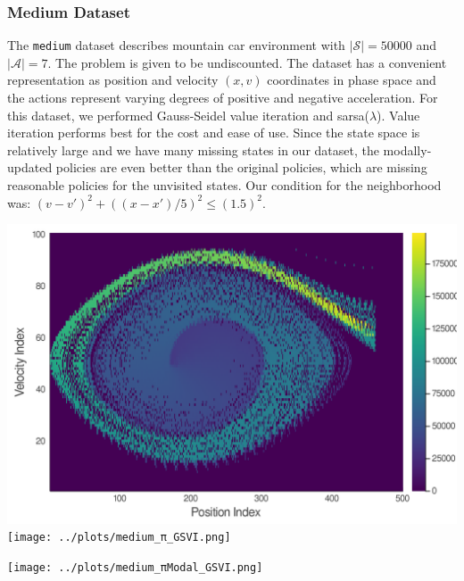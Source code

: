 \documentclass[10pt,letterpaper]{article}
\newenvironment{Figure}
{\par\medskip\noindent\minipage{\linewidth}}
{\endminipage\par\medskip}
\begin{document}
\begin{multicols*}{2}
	\subsubsection*{\sf \textbf{Medium Dataset}}
	
	The \texttt{medium} dataset describes mountain car environment with $|\mathcal{S}| = 50000$ and $|\mathcal{A}| = 7$. The problem is given to be undiscounted. The dataset has a convenient representation as position and velocity $(x,v)$ coordinates in phase space and the actions represent varying degrees of positive and negative acceleration. For this dataset, we performed Gauss-Seidel value iteration and sarsa($\lambda$). Value iteration performs best for the cost and ease of use. Since the state space is relatively large and we have many missing states in our dataset, the modally-updated policies are even better than the original policies, which are missing reasonable policies for the unvisited states. Our condition for the neighborhood was: $(v-v')^2 + ((x-x')/5)^2 \leq (1.5)^2$.
	\begin{Figure}
		\centering
		\includegraphics[width=\linewidth]{../plots/medium_U_GSVI.png}
		\texttt{[image: ../plots/medium\_π\_GSVI.png]}
		\label{fig:medium_U_GSVI}
	\end{Figure}
	\begin{Figure}
		\centering
		\texttt{[image: ../plots/medium\_πModal\_GSVI.png]}

\end{Figure}
\end{multicols*}
\end{document}
